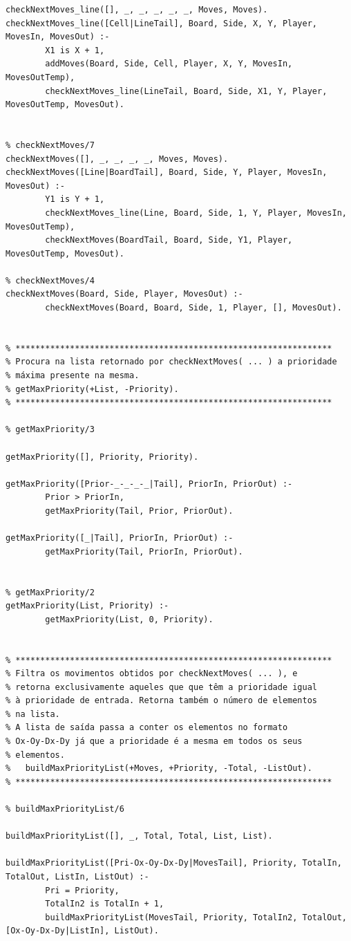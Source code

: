 \documentclass[15pt,a4paper]{article}
\begin{document}
\begin{lstlisting}
checkNextMoves_line([], _, _, _, _, _, Moves, Moves).
checkNextMoves_line([Cell|LineTail], Board, Side, X, Y, Player, MovesIn, MovesOut) :-
		X1 is X + 1,
		addMoves(Board, Side, Cell, Player, X, Y, MovesIn, MovesOutTemp),
		checkNextMoves_line(LineTail, Board, Side, X1, Y, Player, MovesOutTemp, MovesOut).
	

% checkNextMoves/7
checkNextMoves([], _, _, _, _, Moves, Moves).
checkNextMoves([Line|BoardTail], Board, Side, Y, Player, MovesIn, MovesOut) :-
		Y1 is Y + 1,
		checkNextMoves_line(Line, Board, Side, 1, Y, Player, MovesIn, MovesOutTemp),
		checkNextMoves(BoardTail, Board, Side, Y1, Player, MovesOutTemp, MovesOut).

% checkNextMoves/4
checkNextMoves(Board, Side, Player, MovesOut) :-
		checkNextMoves(Board, Board, Side, 1, Player, [], MovesOut).


% ****************************************************************
% Procura na lista retornado por checkNextMoves( ... ) a prioridade
% máxima presente na mesma.
% getMaxPriority(+List, -Priority).
% ****************************************************************

% getMaxPriority/3

getMaxPriority([], Priority, Priority).

getMaxPriority([Prior-_-_-_-_|Tail], PriorIn, PriorOut) :-
		Prior > PriorIn,
		getMaxPriority(Tail, Prior, PriorOut).

getMaxPriority([_|Tail], PriorIn, PriorOut) :-
		getMaxPriority(Tail, PriorIn, PriorOut).

		
% getMaxPriority/2
getMaxPriority(List, Priority) :-
		getMaxPriority(List, 0, Priority).
		

% ****************************************************************
% Filtra os movimentos obtidos por checkNextMoves( ... ), e
% retorna exclusivamente aqueles que que têm a prioridade igual
% à prioridade de entrada. Retorna também o número de elementos
% na lista.
% A lista de saída passa a conter os elementos no formato 
% Ox-Oy-Dx-Dy já que a prioridade é a mesma em todos os seus
% elementos.
%	buildMaxPriorityList(+Moves, +Priority, -Total, -ListOut).
% ****************************************************************

% buildMaxPriorityList/6

buildMaxPriorityList([], _, Total, Total, List, List).

buildMaxPriorityList([Pri-Ox-Oy-Dx-Dy|MovesTail], Priority, TotalIn, TotalOut, ListIn, ListOut) :-
		Pri = Priority,
		TotalIn2 is TotalIn + 1,
		buildMaxPriorityList(MovesTail, Priority, TotalIn2, TotalOut, [Ox-Oy-Dx-Dy|ListIn], ListOut).


\end{lstlisting}
\end{document}
